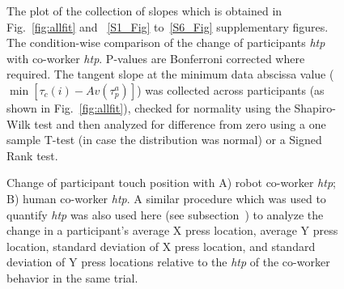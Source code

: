 \begin{figure}[hpbt]
	\caption{The plot of the collection of slopes which is obtained in Fig.~\ref{fig:allfit} and ~\ref{S1_Fig} to~\ref{S6_Fig} supplementary figures. The condition-wise comparison of the change of participants {\it htp} with co-worker {\it htp}. P-values are Bonferroni corrected where required. The tangent slope at the minimum data abscissa value ($\min[\tau_c(i)-Av(\tau_p^a)]$) was collected across participants (as shown in Fig.~\ref{fig:allfit}), checked for normality using the Shapiro-Wilk test and then analyzed for difference from zero using a one sample T-test (in case the distribution was normal) or a Signed Rank test.}
	\label{fig:slope_allcond}
\end{figure}


\begin{figure}[hpbt]
	\caption{Change of participant touch position with A) robot co-worker {\it htp}; B) human co-worker {\it htp}. A similar procedure which was used to quantify {\it htp} was also used here (see subsection~) to analyze the change in a participant's average X press location, average Y press location, standard deviation of X press location, and standard deviation of Y press locations relative to the {\it htp} of the co-worker behavior in the same trial.}
	\label{fig:variance}
\end{figure}


